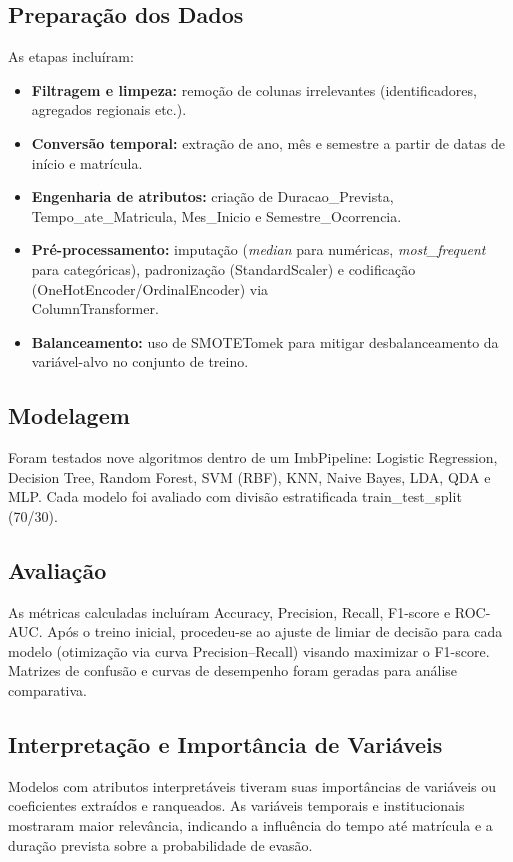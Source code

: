 \documentclass[english, spanish, brazilian]{RBIEarticle} %
\begin{document}
\subsection{Preparação dos Dados}
As etapas incluíram:

\begin{itemize}
  \item \textbf{Filtragem e limpeza:} remoção de colunas irrelevantes (identificadores, agregados regionais etc.).
  
  \item \textbf{Conversão temporal:} extração de ano, mês e semestre a partir de datas de início e matrícula.
  
  \item \textbf{Engenharia de atributos:} criação de \mbox{Duracao\_Prevista}, \mbox{Tempo\_ate\_Matricula}, \mbox{Mes\_Inicio} e \mbox{Semestre\_Ocorrencia}.
  
  \item \textbf{Pré-processamento:} imputação (\textit{median} para numéricas, \mbox{\textit{most\_frequent}} para categóricas), padronização (StandardScaler) e codificação (OneHotEncoder/OrdinalEncoder) via \\ \mbox{ColumnTransformer}.
  
  \item \textbf{Balanceamento:} uso de SMOTETomek para mitigar desbalanceamento da variável-alvo no conjunto de treino.
\end{itemize}

\subsection{Modelagem}
Foram testados nove algoritmos dentro de um ImbPipeline: Logistic Regression, Decision Tree, Random Forest, SVM (RBF), KNN, Naive Bayes, LDA, QDA e MLP. Cada modelo foi avaliado com divisão estratificada train\_test\_split (70/30).

\subsection{Avaliação}
As métricas calculadas incluíram Accuracy, Precision, Recall, F1-score e ROC-AUC. Após o treino inicial, procedeu-se ao ajuste de limiar de decisão para cada modelo (otimização via curva Precision–Recall) visando maximizar o F1-score. Matrizes de confusão e curvas de desempenho foram geradas para análise comparativa.

\subsection{Interpretação e Importância de Variáveis}
Modelos com atributos interpretáveis tiveram suas importâncias de variáveis ou coeficientes extraídos e ranqueados. As variáveis temporais e institucionais mostraram maior relevância, indicando a influência do tempo até matrícula e a duração prevista sobre a probabilidade de evasão.
\end{document}
